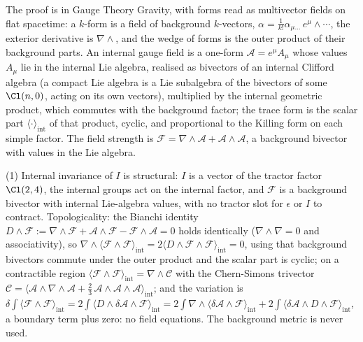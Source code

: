 The proof is in Gauge Theory Gravity, with forms read as multivector fields on flat spacetime: a $k$-form is a field of background $k$-vectors, $\alpha = \tfrac{1}{k!}\alpha_{\mu\ldots}\,e^{\mu}\wedge\cdots$, the exterior derivative is $\nabla\wedge$, and the wedge of forms is the outer product of their background parts. An internal gauge field is a one-form $\mathcal{A} = e^{\mu}A_{\mu}$ whose values $A_{\mu}$ lie in the internal Lie algebra, realised as bivectors of an internal Clifford algebra (a compact Lie algebra is a Lie subalgebra of the bivectors of some $\Cl(n,0)$, acting on its own vectors), multiplied by the internal geometric product, which commutes with the background factor; the trace form is the scalar part $\langle\cdot\rangle_{\mathrm{int}}$ of that product, cyclic, and proportional to the Killing form on each simple factor. The field strength is $\mathcal{F} = \nabla\wedge\mathcal{A} + \mathcal{A}\wedge\mathcal{A}$, a background bivector with values in the Lie algebra.

(1) Internal invariance of $I$ is structural: $I$ is a vector of the tractor factor $\Cl(2,4)$, the internal groups act on the internal factor, and $\mathcal{F}$ is a background bivector with internal Lie-algebra values, with no tractor slot for $\epsilon$ or $I$ to contract. Topologicality: the Bianchi identity $D\wedge\mathcal{F} := \nabla\wedge\mathcal{F} + \mathcal{A}\wedge\mathcal{F} - \mathcal{F}\wedge\mathcal{A} = 0$ holds identically ($\nabla\wedge\nabla = 0$ and associativity), so $\nabla\wedge\langle\mathcal{F}\wedge\mathcal{F}\rangle_{\mathrm{int}} = 2\langle D\wedge\mathcal{F}\wedge\mathcal{F}\rangle_{\mathrm{int}} = 0$, using that background bivectors commute under the outer product and the scalar part is cyclic; on a contractible region $\langle\mathcal{F}\wedge\mathcal{F}\rangle_{\mathrm{int}} = \nabla\wedge\mathcal{C}$ with the Chern-Simons trivector $\mathcal{C} = \langle\mathcal{A}\wedge\nabla\wedge\mathcal{A} + \tfrac23\,\mathcal{A}\wedge\mathcal{A}\wedge\mathcal{A}\rangle_{\mathrm{int}}$; and the variation is $\delta\int\langle\mathcal{F}\wedge\mathcal{F}\rangle_{\mathrm{int}} = 2\int\langle D\wedge\delta\mathcal{A}\wedge\mathcal{F}\rangle_{\mathrm{int}} = 2\int\nabla\wedge\langle\delta\mathcal{A}\wedge\mathcal{F}\rangle_{\mathrm{int}} + 2\int\langle\delta\mathcal{A}\wedge D\wedge\mathcal{F}\rangle_{\mathrm{int}}$, a boundary term plus zero: no field equations. The background metric is never used.

